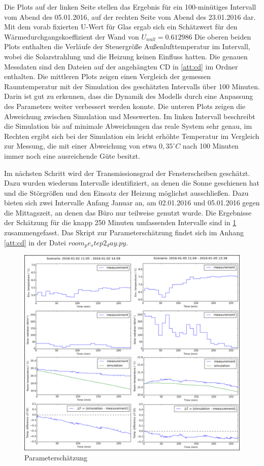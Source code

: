 Die Plots auf der linken Seite stellen das Ergebnis für ein 100-minütiges Intervall vom Abend des 05.01.2016, auf der rechten Seite vom Abend des 23.01.2016 dar. Mit dem vorab fixierten U-Wert für Glas ergab sich ein Schätzwert für den Wärmedurchgangskoeffizient der Wand von $U_{wall}=0.612986$ 
Die oberen beiden Plots enthalten die Verläufe der Steuergröße Außenlufttemperatur im Intervall, wobei die Solarstrahlung und die Heizung keinen Einfluss hatten. Die genauen Messdaten sind den Dateien auf der angehängten CD in \ref{att:cd} im Ordner enthalten. Die mittleren Plots zeigen einen Vergleich der gemessen Raumtemperatur mit der Simulation des geschätzten Intervalls über 100 Minuten. Darin ist gut zu erkennen, dass die Dynamik des Modells durch eine Anpassung des Parameters weiter verbessert werden konnte. Die unteren Plots zeigen die Abweichung zwischen Simulation und Messwerten. Im linken Intervall beschreibt die Simulation bis auf minimale Abweichungen das reale System sehr genau, im Rechten ergibt sich bei der Simulation ein leicht erhöhte Temperatur im Vergleich zur Messung, die mit einer Abweichung von etwa $0,35^{\circ}C$ nach 100 Minuten immer noch eine ausreichende Güte besitzt.

Im nächsten Schritt wird der Transmissionsgrad der Fensterscheiben geschätzt. Dazu wurden wiederum Intervalle identifiziert, an denen die Sonne geschienen hat und die Störgrößen und den Einsatz der Heizung möglichst ausschließen. Dazu bieten sich zwei Intervalle Anfang Januar an, am 02.01.2016 und 05.01.2016 gegen die Mittagszeit, an denen das Büro nur teilweise genutzt wurde. Die Ergebnisse der Schätzung für die knapp 250 Minuten umfassenden Intervalle sind in \ref{fig:step2} zusammengefasst. Das Skript zur Parameterschätzung findet sich im Anhang \ref{att:cd} in der Datei $room_pe_step2_day.py$.

\begin{figure}
\centering
\includegraphics[width=\textwidth]{abbildungen/20160329_pestep2}
\caption{Parameterschätzung}
\label{fig:step2}
\end{figure}

